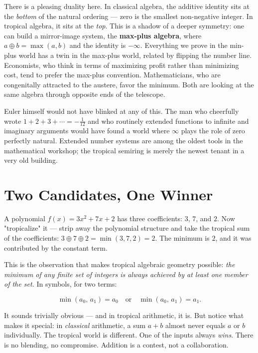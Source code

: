 There is a pleasing duality here. In classical algebra, the additive identity sits at the \textit{bottom} of the natural ordering --- zero is the smallest non-negative integer. In tropical algebra, it sits at the \textit{top}. This is a shadow of a deeper symmetry: one can build a mirror-image system, the \textbf{max-plus algebra}, where $a \oplus b = \max(a,b)$ and the identity is $-\infty$. Everything we prove in the min-plus world has a twin in the max-plus world, related by flipping the number line. Economists, who think in terms of maximizing profit rather than minimizing cost, tend to prefer the max-plus convention. Mathematicians, who are congenitally attracted to the austere, favor the minimum. Both are looking at the same algebra through opposite ends of the telescope.

Euler himself would not have blinked at any of this. The man who cheerfully wrote $1 + 2 + 3 + \cdots = -\tfrac{1}{12}$ and who routinely extended functions to infinite and imaginary arguments would have found a world where $\infty$ plays the role of zero perfectly natural. Extended number systems are among the oldest tools in the mathematical workshop; the tropical semiring is merely the newest tenant in a very old building.


\bigskip


\section{Two Candidates, One Winner}

A polynomial $f(x) = 3x^2 + 7x + 2$ has three coefficients: $3$, $7$, and $2$. Now "tropicalize" it --- strip away the polynomial structure and take the tropical sum of the coefficients: $3 \oplus 7 \oplus 2 = \min(3, 7, 2) = 2$. The minimum is $2$, and it was contributed by the constant term.

This is the observation that makes tropical algebraic geometry possible: \textit{the minimum of any finite set of integers is always achieved by at least one member of the set.} In symbols, for two terms:

\[
\min(a_0,\, a_1) = a_0 \quad \text{or} \quad \min(a_0,\, a_1) = a_1.
\]

It sounds trivially obvious --- and in tropical arithmetic, it is. But notice what makes it special: in \textit{classical} arithmetic, a sum $a + b$ almost never equals $a$ or $b$ individually. The tropical world is different. One of the inputs always \textit{wins}. There is no blending, no compromise. Addition is a contest, not a collaboration.

